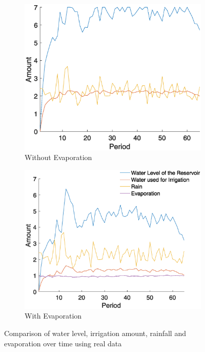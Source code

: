 \documentclass[12pt, a4paper, oneside]{article}
\begin{document}
\begin{figure}[h]
\begin{subfigure}{0.5\textwidth}
	\centering
	\includegraphics[width=1\textwidth]{figures/results-opt-irrigation-over-time-evap-inactive.eps}
	\caption{Without Evaporation}
	\label{fig:water-level-wo-evap}
\end{subfigure}%
\begin{subfigure}{.5\textwidth}
	\centering
	\includegraphics[width=1\textwidth]{figures/results-opt-irrigation-over-time-evap-active.eps}
	\caption{With Evaporation}
	\label{fig:total-utility-wo-evap}
\end{subfigure}
\caption{Comparison of water level, irrigation amount, rainfall and evaporation over time using real data}
\label{fig:without-vs-with-evaporation}
\end{figure}
\end{document}
